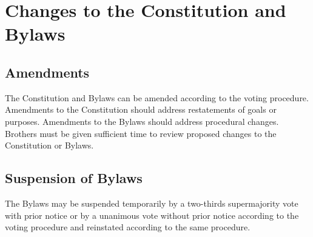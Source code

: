 \chapter{Changes to the Constitution and Bylaws}
\label{cha:changes-to-the-constitution-and-bylaws}

\section{Amendments}
\label{sec:amendments}

The Constitution and Bylaws can be amended according to the voting procedure.
Amendments to the Constitution should address restatements of goals or purposes.
Amendments to the Bylaws should address procedural changes.
Brothers must be given sufficient time to review proposed changes to the
Constitution or Bylaws.

\section{Suspension of Bylaws}
\label{sec:suspension-of-bylaws}

The Bylaws may be suspended temporarily by a two-thirds supermajority vote with
prior notice or by a unanimous vote without prior notice according to the voting
procedure and reinstated according to the same procedure.


